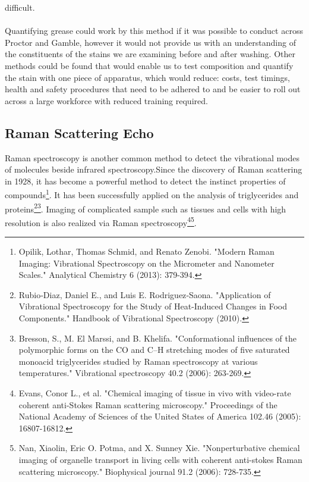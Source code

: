 \documentclass[a4paper ,12pt]{article}
\begin{document}
difficult.\\\\Quantifying grease could work by this method if it was possible to conduct across Proctor and Gamble, however it would not provide us with an understanding of the constituents of the stains we are examining before and after washing. Other methods could be found that would enable us to test composition and quantify the stain with one piece of apparatus, which would reduce: costs, test timings, health and safety procedures that need to be adhered to and be easier to roll out across a large workforce with reduced training required. 

\subsection{Raman Scattering Echo}
Raman spectroscopy is another common method to detect the vibrational modes of molecules beside infrared spectroscopy.Since the discovery of Raman scattering in 1928, it has become a powerful method to detect the instinct properties of compounds\footnote{Opilik, Lothar, Thomas Schmid, and Renato Zenobi. "Modern Raman Imaging: Vibrational Spectroscopy on the Micrometer and Nanometer Scales." Analytical Chemistry 6 (2013): 379-394. }. It has been successfully applied on the analysis of triglycerides and proteins\footnote{Rubio‐Diaz, Daniel E., and Luis E. Rodriguez‐Saona. "Application of Vibrational Spectroscopy for the Study of Heat-Induced Changes in Food Components." Handbook of Vibrational Spectroscopy (2010).}\footnote{Bresson, S., M. El Marssi, and B. Khelifa. "Conformational influences of the polymorphic forms on the CO and C–H stretching modes of five saturated monoacid triglycerides studied by Raman spectroscopy at various temperatures." Vibrational spectroscopy 40.2 (2006): 263-269.}. Imaging of complicated sample such as tissues and cells with high resolution is also realized via Raman spectroscopy\footnote{Evans, Conor L., et al. "Chemical imaging of tissue in vivo with video-rate coherent anti-Stokes Raman scattering microscopy." Proceedings of the National Academy of Sciences of the United States of America 102.46 (2005): 16807-16812.}\footnote{Nan, Xiaolin, Eric O. Potma, and X. Sunney Xie. "Nonperturbative chemical imaging of organelle transport in living cells with coherent anti-stokes Raman scattering microscopy." Biophysical journal 91.2 (2006): 728-735.}.  
\end{document}
